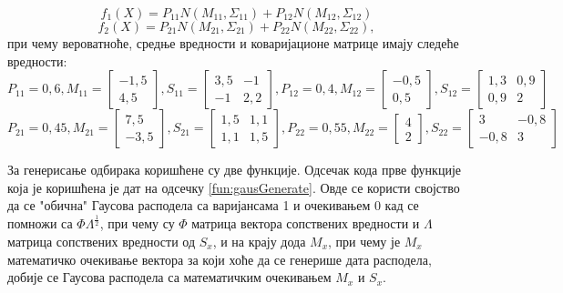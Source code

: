 $$f_1(X) = P_{11} N(M_{11}, \Sigma_{11}) + P_{12} N(M_{12}, \Sigma_{12})$$
$$f_2(X) = P_{21} N(M_{21}, \Sigma_{21}) + P_{22} N(M_{22}, \Sigma_{22}),$$
при чему вероватноће, средње вредности и коваријационе матрице имају следеће вредности:
$$P_{11} = 0,6,  M_{11} = \begin{bmatrix}
   -1,5\\
   4,5
\end{bmatrix}, 
S_{11} = \begin{bmatrix}
				   3,5 & -1\\
				   -1 & 2,2
				\end{bmatrix},
P_{12} = 0,4,  M_{12} = \begin{bmatrix}
										   -0,5\\
										   0,5
										\end{bmatrix}, 
S_{12} = \begin{bmatrix}
				   1,3 & 0,9\\
			   	0,9 &  2
				\end{bmatrix}
$$				
$$P_{21} = 0,45,  M_{21} = \begin{bmatrix}
   7,5\\
   -3,5
\end{bmatrix}, 
S_{21} = \begin{bmatrix}
				   1,5 & 1,1\\
				   1,1 & 1,5
				\end{bmatrix},
P_{22} = 0,55,  M_{22} = \begin{bmatrix}
										   4\\
										   2
										\end{bmatrix}, 
S_{22} = \begin{bmatrix}
				   3 & -0,8\\
			   	-0,8 &  3
				\end{bmatrix}
$$

За генерисање одбирака коришћене су две функције. Одсечак кода прве функције која је коришћена је дат на одсечку \ref{fun:gausGenerate}. Овде се користи својство да се "обична" Гаусова расподела са варијансама 1 и очекивањем 0 кад се помножи са $\Phi \Lambda^\frac{1}{2}$, при чему су $\Phi$ матрица вектора сопствених вредности и $\Lambda$ матрица сопствених вредности од $S_x$, и на крају дода $M_x$, при чему је $M_x$ математичко очекивање вектора за који хоће да се генерише дата расподела, добије се Гаусова расподела са математичким очекивањем $M_x$ и $S_x$.

\renewcommand{\lstlistingname}{Одсечак кода}%
	
